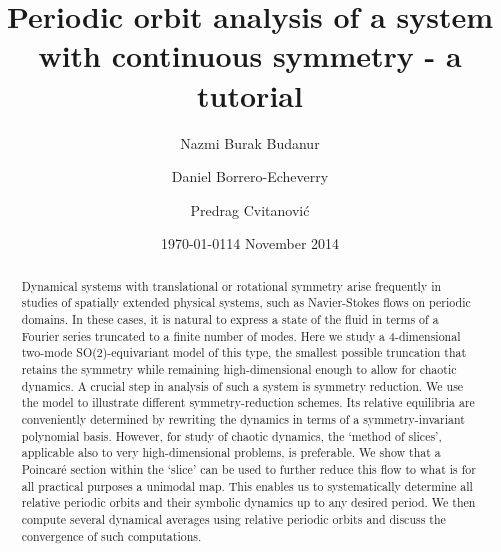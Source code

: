 \documentclass[aip,cha,
reprint,
secnumarabic,
nofootinbib, tightenlines,
nobibnotes, showkeys, showpacs,
superscriptaddress,
]{revtex4-1}
\begin{document}
\title[Periodic orbit analysis of a system with continuous symmetry]
{Periodic orbit analysis of a system with continuous symmetry - a tutorial}

\author{Nazmi Burak Budanur}
\author{Daniel Borrero-Echeverry}
\author{Predrag Cvitanovi\'{c}}
    \ifdraft
\date{\today}
    \else
\date{14 November 2014}
   \fi

\begin{abstract}
Dynamical systems with translational or rotational symmetry arise
frequently in studies of spatially extended physical systems, such as
Navier-Stokes flows on periodic domains. In these cases, it is natural to
express a state of the fluid in terms of a Fourier series truncated to a
finite number of modes. Here we study a 4-dimensional two-mode
SO(2)-equivariant model of this type, the smallest possible truncation
that retains the symmetry while remaining high-dimensional enough to
allow for chaotic dynamics. A crucial step in analysis of such a system
is symmetry reduction. We use the model to illustrate different
symmetry-reduction schemes. Its relative equilibria are conveniently
determined by rewriting the dynamics in terms of a symmetry-invariant
polynomial basis. However, for study of chaotic dynamics, the `method of
slices', applicable also to very high-dimensional problems, is
preferable. We show that a Poincar\'e section within the `slice' can be
used to further reduce this flow to what is for all practical purposes a
unimodal map. This enables us to systematically determine all relative
periodic orbits and their symbolic dynamics up to any desired period. We
then compute several dynamical averages using relative periodic orbits
and discuss the convergence of such computations.
\end{abstract}

\maketitle
\end{document}
